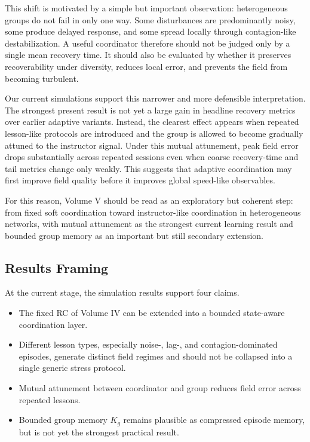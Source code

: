 This shift is motivated by a simple but important observation: heterogeneous groups do not fail in only one way. Some disturbances are predominantly noisy, some produce delayed response, and some spread locally through contagion-like destabilization. A useful coordinator therefore should not be judged only by a single mean recovery time. It should also be evaluated by whether it preserves recoverability under diversity, reduces local error, and prevents the field from becoming turbulent.

Our current simulations support this narrower and more defensible interpretation. The strongest present result is not yet a large gain in headline recovery metrics over earlier adaptive variants. Instead, the clearest effect appears when repeated lesson-like protocols are introduced and the group is allowed to become gradually attuned to the instructor signal. Under this mutual attunement, peak field error drops substantially across repeated sessions even when coarse recovery-time and tail metrics change only weakly. This suggests that adaptive coordination may first improve field quality before it improves global speed-like observables.

For this reason, Volume V should be read as an exploratory but coherent step: from fixed soft coordination toward instructor-like coordination in heterogeneous networks, with mutual attunement as the strongest current learning result and bounded group memory as an important but still secondary extension.

\subsection*{Results Framing}
At the current stage, the simulation results support four claims.
\begin{itemize}
    \item The fixed RC of Volume IV can be extended into a bounded state-aware coordination layer.
    \item Different lesson types, especially noise-, lag-, and contagion-dominated episodes, generate distinct field regimes and should not be collapsed into a single generic stress protocol.
    \item Mutual attunement between coordinator and group reduces field error across repeated lessons.
    \item Bounded group memory $K_g$ remains plausible as compressed episode memory, but is not yet the strongest practical result.
\end{itemize}

